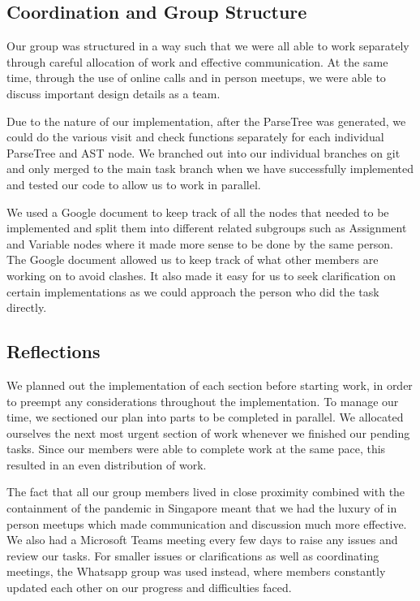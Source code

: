 \documentclass[11pt,a4paper]{article}
\begin{document}
\subsection{Coordination and Group Structure}
Our group was structured in a way such that we were all able to work separately through careful allocation of work and effective communication. At the same time, through the use of online calls and in person meetups, we were able to discuss important design details as a team. 

Due to the nature of our implementation, after the ParseTree was generated, we could do the various visit and check functions separately for each individual ParseTree and AST node. We branched out into our individual branches on git and only merged to the main task branch when we have successfully implemented and tested our code to allow us to work in parallel. 

We used a Google document to keep track of all the nodes that needed to be implemented and split them into different related subgroups such as Assignment and Variable nodes where it made more sense to be done by the same person. The Google document allowed us to keep track of what other members are working on to avoid clashes. It also made it easy for us to seek clarification on certain implementations as we could approach the person who did the task directly.

\subsection{Reflections}
We planned out the implementation of each section before starting work, in order to preempt any considerations throughout the implementation. To manage our time, we sectioned our plan into parts to be completed in parallel. We allocated ourselves the next most urgent section of work whenever we finished our pending tasks. Since our members were able to complete work at the same pace, this resulted in an even distribution of work. 

The fact that all our group members lived in close proximity combined with the containment of the pandemic in Singapore meant that we had the luxury of in person meetups which made communication and discussion much more effective. We also had a Microsoft Teams meeting every few days to raise any issues and review our tasks. For smaller issues or clarifications as well as coordinating meetings, the Whatsapp group was used instead, where members constantly updated each other on our progress and difficulties faced. 
\end{document}
